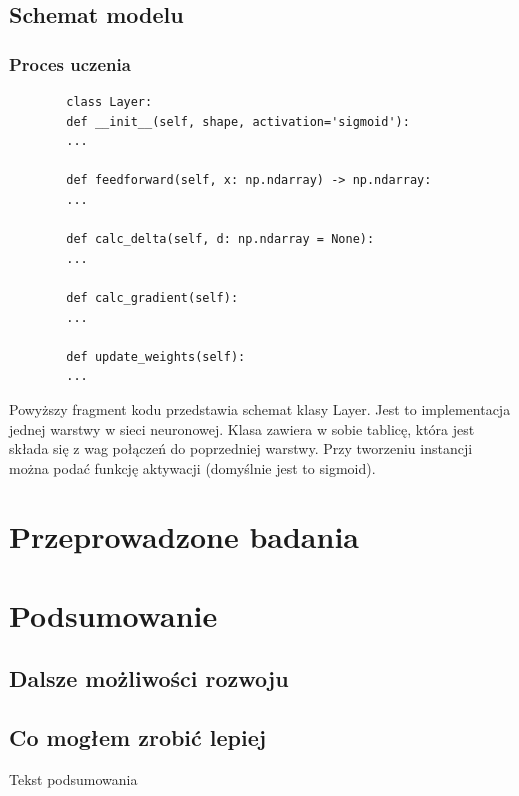 \documentclass{report}
\begin{document}
    \section{Schemat modelu}

    \subsection{Proces uczenia}

    \begin{lstlisting}
        class Layer:
        def __init__(self, shape, activation='sigmoid'):
        ...

        def feedforward(self, x: np.ndarray) -> np.ndarray:
        ...

        def calc_delta(self, d: np.ndarray = None):
        ...

        def calc_gradient(self):
        ...

        def update_weights(self):
        ...
    \end{lstlisting}
    \label{Schemat klasy Layer}


    Powyższy fragment kodu przedstawia schemat klasy Layer.
    Jest to implementacja jednej warstwy w sieci neuronowej.
    Klasa zawiera w sobie tablicę, która jest składa się z wag połączeń do poprzedniej warstwy.
    Przy tworzeniu instancji można podać funkcję aktywacji (domyślnie jest to sigmoid).

    \chapter{Przeprowadzone badania}

    \chapter{Podsumowanie}

    \section{Dalsze możliwości rozwoju}

    \section{Co mogłem zrobić lepiej}

    Tekst podsumowania

    
    

    \listoffigures
    \listoftables
\end{document}
